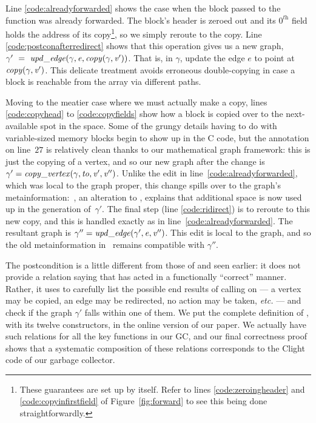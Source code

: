 Line \ref{code:alreadyforwarded} shows
the case when the block passed to the function was already forwarded.
The block's header is zeroed out and its $0^\textit{th}$ field holds
the address of its
copy\footnote{These guarantees are set up by  itself.
Refer to lines \ref{code:zeroingheader} and
\ref{code:copyinfirstfield} of Figure~\ref{fig:forward} to see this being done straightforwardly.},
so we simply reroute to the copy. 
Line \ref{code:postconafterredirect} shows that this operation
gives us a new graph, 
$\gamma'~=~\mathit{upd\_edge}(\gamma, \mathit{e}, \mathit{copy}(\gamma, \mathit{v'}))$.
That is, in $\gamma$, update the edge $e$ to point at
$\mathit{copy}(\gamma, \mathit{v'})$. 
This delicate treatment avoids erroneous double-copying
in case a block is reachable from the  array via different paths.

Moving to the meatier case where we must actually make a copy,
lines \ref{code:copyhead} to \ref{code:copyfields} show
how a block is copied over to the next-available spot in the
 space. Some of the grungy details having to do with
variable-sized memory blocks begin to show up in the C code,
but the annotation on line~$27$ is relatively clean
thanks to our mathematical graph framework:
this is just the copying of a vertex, and so our new graph after the change is
$\gamma' = \mathit{copy\_vertex}(\gamma, \mathit{to}, \mathit{v'}, \mathit{v''})$.
Unlike the edit in line~\ref{code:alreadyforwarded}, which was
local to the graph proper, this
change spills over to the graph's metainformation:~, 
an alteration to , explains that additional 
space is now used up in the  generation of~$\gamma'$. 
The final step (line \ref{code:ridirect}) is to reroute to this
new copy, and this is handled exactly as in line~\ref{code:alreadyforwarded}. 
The resultant graph is $\gamma'' = \mathit{upd\_edge}(\gamma', \mathit{e}, \mathit{v''})$. 
This edit is local to the graph, and so the old metainformation in~ 
remains compatible with $\gamma''$.

The postcondition is a little different from those of 
and  seen earlier: it does not provide a relation
saying that  has acted in a functionally ``correct'' manner. 
Rather, it uses  to carefully list the possible 
end results of calling
 on  --- a vertex may be copied, an edge may be redirected, 
no action may be taken, \emph{etc.} --- and check if the graph
$\gamma'$ falls within one of them.
We put the complete definition
of , with its twelve constructors, 
in the online version of our paper.
We actually have such relations for all the key functions in our GC, 
and our final correctness proof shows that a 
systematic composition of these relations corresponds to the 
Clight code of our garbage collector. 


